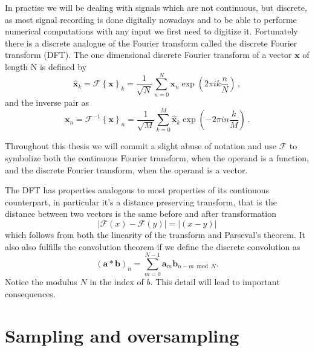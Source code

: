 In practise we will be dealing with signals which are not continuous, but
discrete, as most signal recording is done digitally nowadays and to be able to
performe numerical computations with any input we first need to digitize
it. Fortunately there is a discrete analogue of the Fourier transform called
the discrete Fourier transform (DFT). The one dimensional discrete Fourier
transform of a vector $\mathbf x$ of length N is defined by
\begin{equation}
\hat{\mathbf x}_k = \mathscr{F}\left\{ \mathbf x\right\}_k = \frac{1}{\sqrt{N}} \sum
\limits_{n=0}^{N} \mathbf x_n \exp\left(2 \pi i k \frac{n}{N}\right) \, ,
\end{equation}
and the inverse pair as
\begin{equation}
{\mathbf x}_n = \mathscr{F}^{-1}\left\{ \mathbf x\right\}_n = \frac{1}{\sqrt{M}} \sum
\limits_{k=0}^{M} \hat{\mathbf x}_k \exp\left(-2 \pi i n \frac{k}{M}\right) \, .
\end{equation}

Throughout this thesis we will commit a slight abuse of notation and use
$\mathscr{F}$ to symbolize both the continuous Fourier transform, when the
operand is a function, and the discrete Fourier transform, when the operand is a
vector.
 
The DFT has properties analogous to most properties of its continuous
counterpart, in particular it's a distance preserving transform, that is the distance between two vectors is the same before and after transformation
\begin{equation}
  |\mathscr{F}(x)-\mathscr{F}(y)| = |(x-y)|
\end{equation}
which follows from both the linearity of the transform and Parseval's theorem.
It also also fulfills the convolution theorem if we define the discrete
convolution as
\begin{equation}
  (\mathbf a * \mathbf b)_n = \sum \limits_{m = 0}^{N-1} \mathbf a_m 
  \mathbf  b_{n-m \bmod N} .
\end{equation}
Notice the modulus $N$ in the index of $b$. This detail will lead to important
consequences.

\section{Sampling and oversampling}


